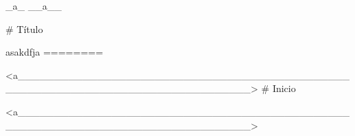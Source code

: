 



_a_ __a__

# Título

asakdfja
========






<a________________________________________________________________________________>
# Inicio



<a________________________________________________________________________________>




















